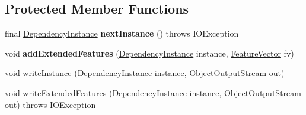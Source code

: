 \subsection*{Protected Member Functions}
\begin{DoxyCompactItemize}
\item 
\hypertarget{classmstparser_1_1DependencyPipe_a7f6ef8cbb814772ce8e442768dd88f66}{
final \hyperlink{classmstparser_1_1DependencyInstance}{DependencyInstance} {\bfseries nextInstance} ()  throws IOException }
\label{classmstparser_1_1DependencyPipe_a7f6ef8cbb814772ce8e442768dd88f66}

\item 
\hypertarget{classmstparser_1_1DependencyPipe_a47c162d01736e43d885c4b9863888d26}{
void {\bfseries addExtendedFeatures} (\hyperlink{classmstparser_1_1DependencyInstance}{DependencyInstance} instance, \hyperlink{classmstparser_1_1FeatureVector}{FeatureVector} fv)}
\label{classmstparser_1_1DependencyPipe_a47c162d01736e43d885c4b9863888d26}

\item 
void \hyperlink{classmstparser_1_1DependencyPipe_a3ea85c069bcfe3ddfb89cb6c031d8f36}{writeInstance} (\hyperlink{classmstparser_1_1DependencyInstance}{DependencyInstance} instance, ObjectOutputStream out)
\item 
void \hyperlink{classmstparser_1_1DependencyPipe_a08ecc2b509221d129c2e46fc143a80bc}{writeExtendedFeatures} (\hyperlink{classmstparser_1_1DependencyInstance}{DependencyInstance} instance, ObjectOutputStream out)  throws IOException 
\end{DoxyCompactItemize}


